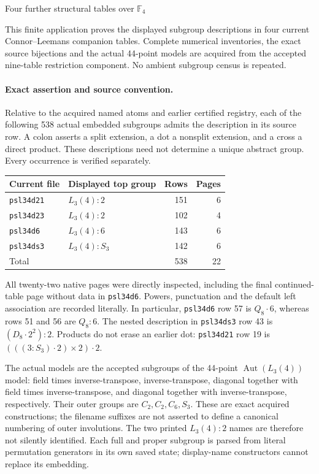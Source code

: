 \documentclass[11pt]{article}
\begin{document}
\begin{center}\Large Four further structural tables over $\mathbb F_4$\end{center}
\noindent This finite application proves the displayed subgroup descriptions
in four current Connor--Leemans companion tables. Complete numerical
inventories, the exact source bijections and the actual 44-point models
are acquired from the accepted nine-table restriction component. No ambient
subgroup census is repeated.

\paragraph{Exact assertion and source convention.}
Relative to the acquired named atoms and earlier certified registry, each
of the following 538 actual embedded subgroups admits the description in
its source row. A colon asserts a split extension, a dot a nonsplit
extension, and a cross a direct product. These descriptions need not
determine a unique abstract group. Every occurrence is verified separately.
\begin{center}
\begin{tabular}{llrr}\toprule
Current file&Displayed top group&Rows&Pages\\\midrule
\texttt{psl34d21}&$L_3(4):2$&151&6\\
\texttt{psl34d23}&$L_3(4):2$&102&4\\
\texttt{psl34d6}&$L_3(4):6$&143&6\\
\texttt{psl34ds3}&$L_3(4):S_3$&142&6\\\midrule
Total&&538&22\\\bottomrule
\end{tabular}
\end{center}
All twenty-two native pages were directly inspected, including the final
continued-table page without data in \texttt{psl34d6}. Powers, punctuation
and the default left association are recorded literally. In particular,
\texttt{psl34d6} row 57 is $Q_8\mathbin{\cdot}6$, whereas rows 51 and 56
are $Q_8:6$. The nested description in \texttt{psl34ds3} row 43 is
$(D_8\mathbin{\cdot}2^2):2$. Products do not erase an earlier dot:
\texttt{psl34d21} row 19 is
$(((3:S_3)\mathbin{\cdot}2)\times2)\mathbin{\cdot}2$.

The actual models are the accepted subgroups of the 44-point
$\operatorname{Aut}(L_3(4))$ model: field times inverse-transpose,
inverse-transpose, diagonal together with field times inverse-transpose,
and diagonal together with inverse-transpose, respectively. Their outer
groups are $C_2,C_2,C_6,S_3$. These are exact acquired constructions;
the filename suffixes are not asserted to define a canonical numbering
of outer involutions. The two printed $L_3(4):2$ names are therefore not
silently identified. Each full and proper subgroup is parsed from literal
permutation generators in its own saved state; display-name constructors
cannot replace its embedding.
\end{document}
